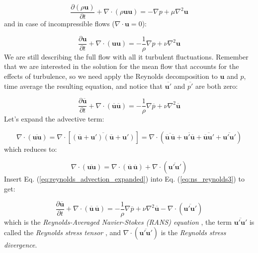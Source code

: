 \documentclass[12pt]{article}
\numberwithin{equation}{section}
\numberwithin{figure}{section}
\numberwithin{table}{section}
\begin{document}
\begin{equation}
  \frac{\partial (\rho \mathbf{u})}{\partial t} +
  \nabla \cdot (\rho \mathbf{u} \mathbf{u}) =
  - \nabla p + \mu \nabla^2 \mathbf{u}
\end{equation}
and in case of incompressible flows ($\nabla \cdot \mathbf{u} = 0$):

\begin{equation}
  \frac{\partial \mathbf{u}}{\partial t} +
  \nabla \cdot (\mathbf{u} \mathbf{u}) =
  - \frac{1}{\rho} \nabla p + \nu \nabla^2 \mathbf{u}
  \label{eq:ns_reynolds3}
\end{equation}
We are still describing the full flow with all it turbulent fluctuations.
Remember that we are interested in the solution for the mean flow that accounts
for the effects of turbulence, so we need apply the Reynolds decomposition to
$\mathbf{u}$ and $p$, time average the resulting equation, and notice that
$\overline{\mathbf{u}'}$ and $\overline{p'}$ are both zero:

\begin{equation}
  \frac{\partial \overline{\mathbf{u}}}{\partial t} +
  \nabla \cdot (\overline{\mathbf{u}} \overline{\mathbf{u}}) =
  - \frac{1}{\rho} \nabla \overline{p} + \nu \nabla^2 \overline{\mathbf{u}}
\end{equation}
Let's expand the advective term:

\begin{equation}
   \nabla \cdot (\overline{\mathbf{u} {\mathbf{u}}}) =
   \nabla \cdot [\overline{(\overline{\mathbf{u}} + \mathbf{u}')(\overline{\mathbf{u}} + \mathbf{u}')}] =
   \nabla \cdot (\overline{\overline{\mathbf{u}}\, \overline{\mathbf{u}}} + \overline{\mathbf{u}' \overline{\mathbf{u}}} + \overline{\overline{\mathbf{u}} \mathbf{u}'} + \overline{\mathbf{u}' \mathbf{u}'})
\end{equation}
which reduces to:

\begin{equation}
  \nabla \cdot (\overline{\mathbf{u} \mathbf{u}}) =
  \nabla \cdot (\overline{\mathbf{u}}\, \overline{\mathbf{u}}) + \nabla \cdot (\overline{\mathbf{u}' \mathbf{u}'})
  \label{eq:reynolds_advection_expanded}
\end{equation}
Insert Eq. (\ref{eq:reynolds_advection_expanded}) into Eq. (\ref{eq:ns_reynolds3}) to get:

\begin{equation}
  \frac{\partial \overline{\mathbf{u}}}{\partial t} +
  \nabla \cdot (\overline{\mathbf{u}}\, \overline{\mathbf{u}}) =
  - \frac{1}{\rho} \nabla \overline{p} +
  \nu \nabla^2 \overline{\mathbf{u}}
  - \nabla \cdot (\overline{\mathbf{u}' \mathbf{u}'})
  \label{eq:rans}
\end{equation}
which is the \textit{Reynolds-Averaged Navier-Stokes (RANS) equation}
, the term
$\overline{\mathbf{u}' \mathbf{u}'}$ is called the \textit{Reynolds stress tensor}
,
and $\nabla \cdot (\overline{\mathbf{u}' \mathbf{u}'})$ is the
\textit{Reynolds stress divergence}.
\end{document}
